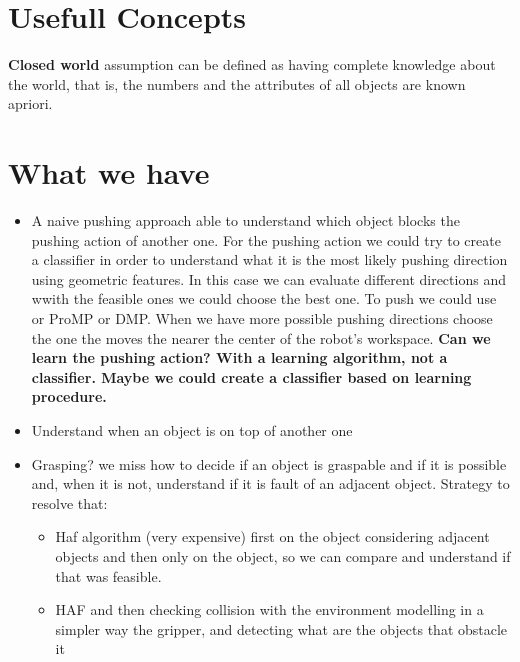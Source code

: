 \section{Usefull Concepts}
 \textbf{Closed world} assumption \citep{Reiter87} can be defined
as having complete knowledge about the world, that is, the numbers and the attributes
of all objects are known apriori. 

\iffalse
\section{What we have}
\begin{itemize}
\item A naive pushing approach able to understand which object blocks the pushing action of another one.
For the pushing action we could try to create a classifier in order to understand what it is the most likely pushing direction using geometric features. In this case we can evaluate different directions and wwith the feasible ones we could choose the best one. 
To push we could use or ProMP or DMP. When we have more possible pushing directions choose the one the moves the nearer the center of the robot's workspace.
\textbf{Can we learn the pushing action? With a learning algorithm, not a classifier. Maybe we could create a classifier based on learning procedure.}
\item Understand when an object is on top of another one
\item Grasping? we miss how to decide if an object is graspable and if it is possible and, when it is not, understand if it is fault of an adjacent object. 
Strategy to resolve that:
\begin{itemize}
\item Haf algorithm (very expensive) first on the object considering adjacent objects and then only on the object, so we can compare and understand if that was feasible. 
\item HAF and then checking collision with the environment modelling in a simpler way the gripper, and detecting what are the objects that obstacle it


\end{itemize}
\end{itemize}
